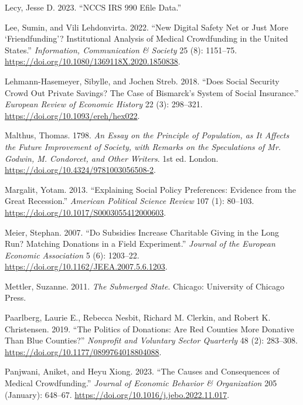 \documentclass[
  11pt,
  oneside]{article}
\newlength{\cslhangindent}
\newenvironment{CSLReferences}[2] %
 {\begin{list}{}{%
  \setlength{\itemindent}{0pt}
  \setlength{\leftmargin}{0pt}
  \setlength{\parsep}{0pt}
  \ifodd #1
   \setlength{\leftmargin}{\cslhangindent}
   \setlength{\itemindent}{-1\cslhangindent}
  \fi
  \setlength{\itemsep}{#2\baselineskip}}}
 {\end{list}}
\begin{document}
\begin{CSLReferences}{1}{0}
Lecy, Jesse D. 2023. {``{NCCS IRS} 990 {Efile Data}.''}

Lee, Sumin, and Vili Lehdonvirta. 2022. {``New Digital Safety Net or Just More {`Friendfunding'}? {Institutional} Analysis of Medical Crowdfunding in the {United States}.''} \emph{Information, Communication \& Society} 25 (8): 1151--75. \url{https://doi.org/10.1080/1369118X.2020.1850838}.

Lehmann-Hasemeyer, Sibylle, and Jochen Streb. 2018. {``Does {Social Security Crowd Out Private Savings}? {The Case} of {Bismarck}'s {System} of {Social Insurance}.''} \emph{European Review of Economic History} 22 (3): 298--321. \url{https://doi.org/10.1093/ereh/hex022}.

Malthus, Thomas. 1798. \emph{An {Essay} on the {Principle} of {Population}, as It {Affects} the {Future Improvement} of {Society}, with {Remarks} on the {Speculations} of {Mr}. {Godwin}, {M}. {Condorcet}, and {Other Writers}}. 1st ed. London. \url{https://doi.org/10.4324/9781003056508-2}.

Margalit, Yotam. 2013. {``Explaining {Social Policy Preferences}: {Evidence} from the {Great Recession}.''} \emph{American Political Science Review} 107 (1): 80--103. \url{https://doi.org/10.1017/S0003055412000603}.

Meier, Stephan. 2007. {``Do {Subsidies Increase Charitable Giving} in the {Long Run}? {Matching Donations} in a {Field Experiment}.''} \emph{Journal of the European Economic Association} 5 (6): 1203--22. \url{https://doi.org/10.1162/JEEA.2007.5.6.1203}.

Mettler, Suzanne. 2011. \emph{The {Submerged State}}. Chicago: University of Chicago Press.

Paarlberg, Laurie E., Rebecca Nesbit, Richard M. Clerkin, and Robert K. Christensen. 2019. {``The {Politics} of {Donations}: {Are Red Counties More Donative Than Blue Counties}?''} \emph{Nonprofit and Voluntary Sector Quarterly} 48 (2): 283--308. \url{https://doi.org/10.1177/0899764018804088}.

Panjwani, Aniket, and Heyu Xiong. 2023. {``The Causes and Consequences of Medical Crowdfunding.''} \emph{Journal of Economic Behavior \& Organization} 205 (January): 648--67. \url{https://doi.org/10.1016/j.jebo.2022.11.017}.


\end{CSLReferences}
\end{document}
